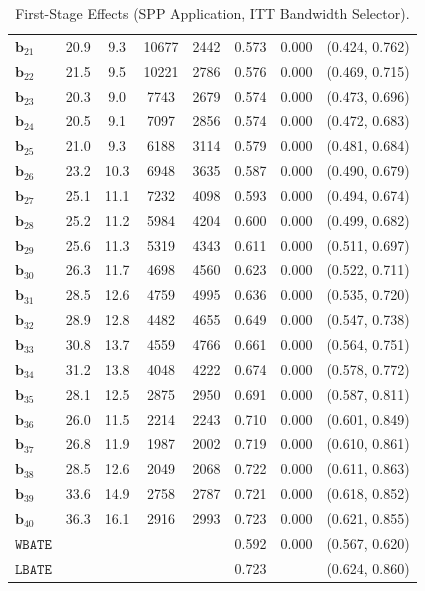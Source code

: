 \documentclass[10pt]{article}
\newcommand{\bb}{\mathbf{b}}
\begin{document}
\begin{table}[p]
\begin{tabular}{lccccccc}
   $\bb_{21}$ & 20.9 & 9.3 & 10677 & 2442 & 0.573 & 0.000 & (0.424, 0.762)\\
   $\bb_{22}$ & 21.5 & 9.5 & 10221 & 2786 & 0.576 & 0.000 & (0.469, 0.715)\\
   $\bb_{23}$ & 20.3 & 9.0 & 7743 & 2679 & 0.574 & 0.000 & (0.473, 0.696)\\
   $\bb_{24}$ & 20.5 & 9.1 & 7097 & 2856 & 0.574 & 0.000 & (0.472, 0.683)\\
   $\bb_{25}$ & 21.0 & 9.3 & 6188 & 3114 & 0.579 & 0.000 & (0.481, 0.684)\\
   $\bb_{26}$ & 23.2 & 10.3 & 6948 & 3635 & 0.587 & 0.000 & (0.490, 0.679)\\
   $\bb_{27}$ & 25.1 & 11.1 & 7232 & 4098 & 0.593 & 0.000 & (0.494, 0.674)\\
   $\bb_{28}$ & 25.2 & 11.2 & 5984 & 4204 & 0.600 & 0.000 & (0.499, 0.682)\\
   $\bb_{29}$ & 25.6 & 11.3 & 5319 & 4343 & 0.611 & 0.000 & (0.511, 0.697)\\
   $\bb_{30}$ & 26.3 & 11.7 & 4698 & 4560 & 0.623 & 0.000 & (0.522, 0.711)\\
   $\bb_{31}$ & 28.5 & 12.6 & 4759 & 4995 & 0.636 & 0.000 & (0.535, 0.720)\\
   $\bb_{32}$ & 28.9 & 12.8 & 4482 & 4655 & 0.649 & 0.000 & (0.547, 0.738)\\
   $\bb_{33}$ & 30.8 & 13.7 & 4559 & 4766 & 0.661 & 0.000 & (0.564, 0.751)\\
   $\bb_{34}$ & 31.2 & 13.8 & 4048 & 4222 & 0.674 & 0.000 & (0.578, 0.772)\\
   $\bb_{35}$ & 28.1 & 12.5 & 2875 & 2950 & 0.691 & 0.000 & (0.587, 0.811)\\
   $\bb_{36}$ & 26.0 & 11.5 & 2214 & 2243 & 0.710 & 0.000 & (0.601, 0.849)\\
   $\bb_{37}$ & 26.8 & 11.9 & 1987 & 2002 & 0.719 & 0.000 & (0.610, 0.861)\\
   $\bb_{38}$ & 28.5 & 12.6 & 2049 & 2068 & 0.722 & 0.000 & (0.611, 0.863)\\
   $\bb_{39}$ & 33.6 & 14.9 & 2758 & 2787 & 0.721 & 0.000 & (0.618, 0.852)\\
   $\bb_{40}$ & 36.3 & 16.1 & 2916 & 2993 & 0.723 & 0.000 & (0.621, 0.855)\\
  \midrule
   $\mathtt{WBATE}$ &  &  &  &  & 0.592 & 0.000 & (0.567, 0.620)\\
  \midrule
   $\mathtt{LBATE}$ &  &  &  &  & 0.723 &  & (0.624, 0.860)\\
  \bottomrule\bottomrule
\end{tabular}

    \caption{First-Stage Effects (SPP Application, ITT Bandwidth Selector).}
    \label{tab:sa-empapp_main_fs}
\end{table}
\end{document}
